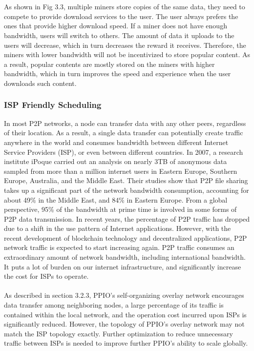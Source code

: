\documentclass[10pt,a4paper]{article}
\begin{document}
\vspace{-1.5em}
\\ \\ As shown in Fig 3.3, multiple miners store copies of the same data, they need to compete to provide download services to the user. The user always prefers the ones that provide higher download speed. If a miner does not have enough bandwidth, users will switch to others. The amount of data it uploads to the users will decrease, which in turn decreases the reward it receives. Therefore, the miners with lower bandwidth will not be incentivized to store popular content. As a result, popular contents are mostly stored on the miners with higher bandwidth, which in turn improves the speed and experience when the user downloads such content.
\vspace{-0.5em}
\subsubsection{ISP Friendly Scheduling}  %
In most P2P networks, a node can transfer data with any other peers, regardless of their location. As a result, a single data transfer can potentially create traffic anywhere in the world and consumes bandwidth between different Internet Service Providers (ISP), or even between different countries. In 2007, a research institute iPoque carried out an analysis on nearly 3TB of anonymous data sampled from more than a million internet users in Eastern Europe, Southern Europe, Australia, and the Middle East. \cite{article26}Their studies show that P2P file sharing takes up a significant part of the network bandwidth consumption, accounting for about 49\% in the Middle East, and 84\% in Eastern Europe. From a global perspective, 95\% of the bandwidth at prime time is involved in some forms of P2P data transmission. In recent years, the percentage of P2P traffic has dropped due to a shift in the use pattern of Internet applications. However, with the recent development of blockchain technology and decentralized applications, P2P network traffic is expected to start increasing again. P2P traffic consumes an extraordinary amount of network bandwidth, including international bandwidth. It puts a lot of burden on our internet infrastructure, and significantly increase the cost for ISPs to operate.
\vspace{-0.5em}
 \\ \\As described in section 3.2.3, PPIO’s self-organizing overlay network encourages data transfer among neighboring nodes, a large percentage of its traffic is contained within the local network, and the operation cost incurred upon ISPs is significantly reduced. However, the  topology of PPIO’s overlay network may not match the ISP topology exactly. Further optimization to reduce unnecessary traffic between ISPs is needed to improve further PPIO’s ability to scale globally.
\end{document}
